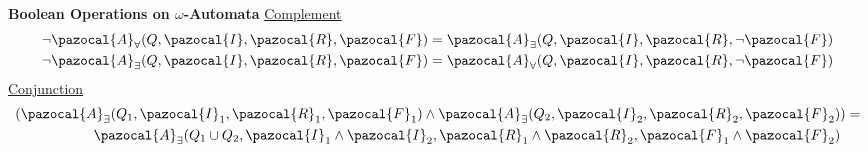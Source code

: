 \documentclass{article}
\newcommand{\Ib}{\pazocal{I}}
\newcommand{\Rb}{\pazocal{R}}
\newcommand{\Ab}{\pazocal{A}}
\newcommand{\Fb}{\pazocal{F}}
\begin{document}
\begin{multicols}{4}

\textbf{Boolean Operations on $\omega$-Automata}
\underline{Complement}
\begin{align*}
\neg \Ab_{\forall}(Q,\Ib,\Rb,\Fb)=\Ab_{\exists}(Q,\Ib,\Rb,\neg \Fb) \\
\neg \Ab_{\exists}(Q,\Ib,\Rb,\Fb)=\Ab_{\forall}(Q,\Ib,\Rb,\neg \Fb)
\end{align*}
\underline{Conjunction}
\begin{align*}
(\Ab_{\exists}(Q_1,\Ib_1,\Rb_1,\Fb_1)\wedge \Ab_{\exists}(Q_2,\Ib_2,\Rb_2,\Fb_2)&)=\\
\Ab_{\exists}(Q_1 \cup Q_2,\Ib_1 \wedge \Ib_2,\Rb_1 \wedge \Rb_2,\Fb_1 \wedge \Fb_2)&
\end{align*}


\end{multicols}
\end{document}
